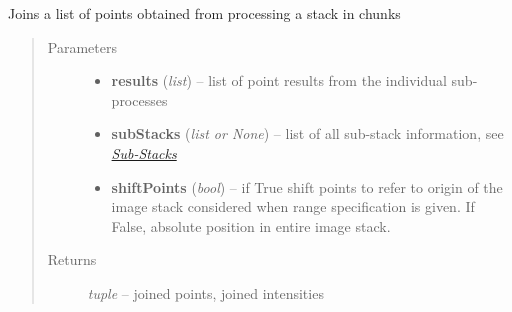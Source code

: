 \documentclass[letterpaper,10pt,english]{sphinxmanual}
\begin{document}

\begin{fulllineitems}
\label{api/ClearMap.ImageProcessing:ClearMap.ImageProcessing.StackProcessing.joinPoints}
Joins a list of points obtained from processing a stack in chunks
\begin{quote}\begin{description}
\item[{Parameters}] \leavevmode\begin{itemize}
\item {} 
\textbf{results} (\emph{list}) --
list of point results from the individual sub-processes

\item {} 
\textbf{subStacks} (\emph{list or None}) --
list of all sub-stack information, see {\hyperref[api/ClearMap.ImageProcessing:substack]{\emph{Sub-Stacks}}}

\item {} 
\textbf{shiftPoints} (\emph{bool}) --
if True shift points to refer to origin of the image stack considered
when range specification is given. If False, absolute
position in entire image stack.

\end{itemize}

\item[{Returns}] \leavevmode
\emph{tuple} --
joined points, joined intensities

\end{description}\end{quote}

\end{fulllineitems}

\end{document}
